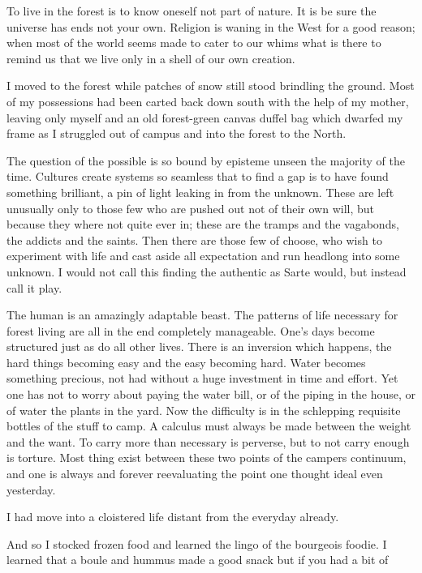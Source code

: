 \documentclass[ebook, 10pt, openright, onecolumn]{memoir}
\begin{document}
To live in the forest is to know oneself not part of nature.  It is be sure the
universe has ends not your own.  Religion is waning in the West for a good
reason; when most of the world seems made to cater to our whims what is there to
remind us that we live only in a shell of our own creation.

I moved to the forest while patches of snow still stood brindling the
ground. Most of my possessions had been carted back down south with the help of
my mother, leaving only myself and an old forest-green canvas duffel bag which
dwarfed my frame as I struggled out of campus and into the forest to the North.

The question of the possible is so bound by episteme unseen the majority of the
time.  Cultures create systems so seamless that to find a gap is to have found
something brilliant, a pin of light leaking in from the unknown.  These are left
unusually only to those few who are pushed out not of their own will, but
because they where not quite ever in; these are the tramps and the vagabonds,
the addicts and the saints.  Then there are those few of choose, who wish to
experiment with life and cast aside all expectation and run headlong into some
unknown.  I would not call this finding the authentic as Sarte would, but
instead call it play.

The human is an amazingly adaptable beast.  The patterns of life necessary for
forest living are all in the end completely manageable.  One's days become
structured just as do all other lives.  There is an inversion which happens, the
hard things becoming easy and the easy becoming hard.  Water becomes something
precious, not had without a huge investment in time and effort.  Yet one has not
to worry about paying the water bill, or of the piping in the house, or of water
the plants in the yard.  Now the difficulty is in the schlepping requisite
bottles of the stuff to camp.  A calculus must always be made between the weight
and the want.  To carry more than necessary is perverse, but to not carry enough
is torture.  Most thing exist between these two points of the campers continuum,
and one is always and forever reevaluating the point one thought ideal
even yesterday. 

I had move into a cloistered life distant from the everyday already.

And so I stocked frozen food and learned the lingo of the bourgeois foodie. I
learned that a boule and hummus made a good snack but if you had a bit of  
\end{document}
